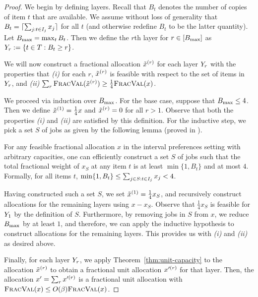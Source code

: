 \begin{proof}
  We begin by defining layers. Recall that $B_t$ denotes the number of
  copies of item $t$ that are available. We assume without loss of
  generality that $B_t = \lceil \sum_{j: t\in \intj} x_j\rceil$ for
  all $t$ (and otherwise redefine $B_t$ to be the latter
  quantity). Let $\Bmax = \max_t B_t$. Then we define the $r$th layer
  for $r\in [\Bmax]$ as $\layer:=\{t\in\items:B_t\geq r\}$. 

  We will now construct a fractional allocation $\xr$ for each layer
  $\layer$ with the properties that {\em (i)} for each $r$, $\xr$ is
  feasible with respect to the set of items in $\layer$, and {\em
    (ii)} $\sum_r \fval(\xr) \ge \frac 14 \fval(x)$.

    We proceed via induction over $\Bmax$. For the base case, suppose that
    $\Bmax\le 4$. Then we define $\xr[1] = \frac 14 x$ and $\xr=0$ for all
    $r>1$. Observe that both the properties {\em (i)} and {\em (ii)} are
    satisfied by this definition. For the inductive step, we pick a set $S$ of
    jobs as given by the following lemma (proved in ). 

    \begin{lemma}
        \label{lem:greedy-layer}
        For any feasible fractional allocation $x$ in the interval
        preferences setting with arbitrary capacities, one can
        efficiently construct a set $S$ of jobs such that the total
        fractional weight of $x_S$ at any item $t$ is at least
        $\min\{1,B_t\}$ and at most $4$.  Formally, for all items $t$,
        $\min\{1,B_t\}\le \sum_{j\in S: t\in \intj} x_j < 4$.
    \end{lemma}

    Having constructed such a set $S$, we set $\xr[1] = \frac 14 x_S$, and
    recursively construct allocations for the remaining layers using $x-x_S$.
    Observe that $\frac 14 x_S$ is feasible for $\layer[1]$ by the definition
    of $S$. Furthermore, by removing jobs in $S$ from $x$, we reduce $\Bmax$ by
    at least $1$, and therefore, we can apply the inductive hypothesis to
    construct allocations for the remaining layers. This provides us with {\em
    (i)} and {\em (ii)} as desired above.

    Finally, for each layer $\layer$, we apply Theorem~\ref{thm:unit-capacity}
    to the allocation $\xr$ to obtain a fractional unit allocation $\xpr$ for
    that layer. Then, the allocation $x' = \sum_r \xpr$ is a fractional unit
    allocation with $\fval(x)\le O(\beta) \fval(x)$.
\end{proof}

